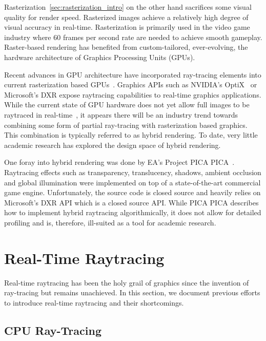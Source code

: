 Rasterization~\autoref{sec:rasterization_intro} on the other hand sacrifices some visual quality for render speed. Rasterized images achieve a relatively high degree of visual accuracy in real-time. Rasterization is primarily used in the video game industry where 60 frames per second rate are needed to achieve smooth gameplay. Raster-based rendering has benefited from custom-tailored, ever-evolving, the hardware architecture of Graphics Processing Units (GPUs).

Recent advances in GPU architecture have incorporated ray-tracing elements into current rasterization based GPUs~\cite{10.1145/2492045.2492057, Parker_optix:a}. Graphics APIs such as NVIDIA's OptiX~\cite{Parker_optix:a} or Microsoft's DXR expose raytracing capabilities to real-time graphics applications.  While the current state of GPU hardware does not yet allow full images to be raytraced in real-time~\cite{10.5555/1921479.1921497}, it appears there will be an industry trend towards combining some form of partial ray-tracing with rasterization based graphics. This combination is typically referred to as hybrid rendering.  To date, very little academic research has explored the design space of hybrid rendering.

One foray into hybrid rendering was done by EA's Project PICA PICA~\cite{Barre_Brisebois2019}. Raytracing effects such as transparency, translucency, shadows, ambient occlusion and global illumination were implemented on top of a state-of-the-art commercial game engine. Unfortunately, the source code is closed source and heavily relies on Microsoft's DXR API which is a closed source API. While PICA PICA describes how to implement hybrid raytracing algorithmically, it does not allow for detailed profiling and is, therefore, ill-suited as a tool for academic research. 

\section{Real-Time Raytracing}
\label{sec:gpu_intro}

Real-time raytracing has been the holy grail of graphics since the invention of ray-tracing but remains unachieved.
In this section, we document previous efforts to introduce real-time raytracing and their shortcomings.

\subsection{CPU Ray-Tracing}

